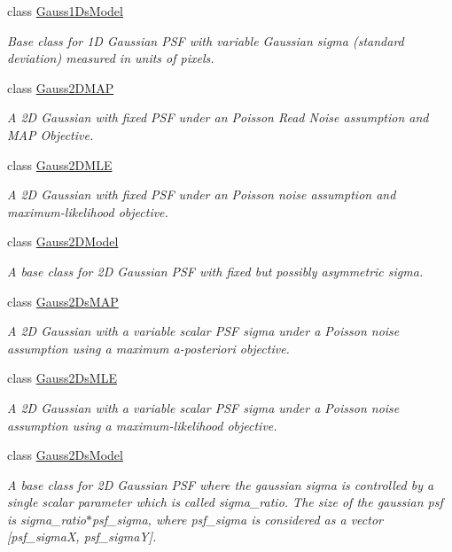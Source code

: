 \begin{DoxyCompactItemize}
class \hyperlink{classmappel_1_1Gauss1DsModel}{Gauss1\+Ds\+Model}
\begin{DoxyCompactList}\small\item\em Base class for 1D Gaussian P\+SF with variable Gaussian sigma (standard deviation) measured in units of pixels. \end{DoxyCompactList}\item 
class \hyperlink{classmappel_1_1Gauss2DMAP}{Gauss2\+D\+M\+AP}
\begin{DoxyCompactList}\small\item\em A 2D Gaussian with fixed P\+SF under an Poisson Read Noise assumption and M\+AP Objective. \end{DoxyCompactList}\item 
class \hyperlink{classmappel_1_1Gauss2DMLE}{Gauss2\+D\+M\+LE}
\begin{DoxyCompactList}\small\item\em A 2D Gaussian with fixed P\+SF under an Poisson noise assumption and maximum-\/likelihood objective. \end{DoxyCompactList}\item 
class \hyperlink{classmappel_1_1Gauss2DModel}{Gauss2\+D\+Model}
\begin{DoxyCompactList}\small\item\em A base class for 2D Gaussian P\+SF with fixed but possibly asymmetric sigma. \end{DoxyCompactList}\item 
class \hyperlink{classmappel_1_1Gauss2DsMAP}{Gauss2\+Ds\+M\+AP}
\begin{DoxyCompactList}\small\item\em A 2D Gaussian with a variable scalar P\+SF sigma under a Poisson noise assumption using a maximum a-\/posteriori objective. \end{DoxyCompactList}\item 
class \hyperlink{classmappel_1_1Gauss2DsMLE}{Gauss2\+Ds\+M\+LE}
\begin{DoxyCompactList}\small\item\em A 2D Gaussian with a variable scalar P\+SF sigma under a Poisson noise assumption using a maximum-\/likelihood objective. \end{DoxyCompactList}\item 
class \hyperlink{classmappel_1_1Gauss2DsModel}{Gauss2\+Ds\+Model}
\begin{DoxyCompactList}\small\item\em A base class for 2D Gaussian P\+SF where the gaussian sigma is controlled by a single scalar parameter which is called sigma\+\_\+ratio. The size of the gaussian psf is sigma\+\_\+ratio$\ast$psf\+\_\+sigma, where psf\+\_\+sigma is considered as a vector \mbox{[}psf\+\_\+sigmaX, psf\+\_\+sigmaY\mbox{]}. \end{DoxyCompactList}\item 

\end{DoxyCompactItemize}
